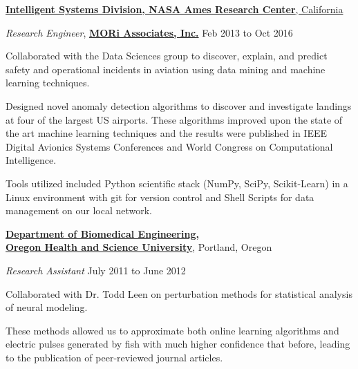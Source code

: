 \documentclass[10pt]{article}
\newenvironment{outerlist}[1][\enskip$\circ$]%
        {\begin{itemize}[#1]}{\end{itemize}%
         \vspace{-.6\baselineskip}}
\newenvironment{innerlist}[1][\enskip$\circ$]%
        {\begin{compactitem}[#1]}{\end{compactitem}}
\begin{document}
\href{http://ti.arc.nasa.gov/}{\textbf{Intelligent Systems Division, NASA Ames Research Center}, California}
\begin{outerlist}
\item[] \textit{Research Engineer}, \href{http://www.moriassociates.com/}{\textbf{MORi Associates, Inc.}} %
\hfill{Feb 2013 to Oct 2016}

  \begin{innerlist}
    \item Collaborated with the Data Sciences group to discover, explain, and predict safety and operational incidents in aviation using data mining and machine learning techniques.
    \item Designed novel anomaly detection algorithms to discover and investigate landings at four of the largest US airports. These algorithms improved upon the state of the art machine learning techniques and the results were published in {\sc IEEE Digital Avionics Systems Conferences} and { World Congress on Computational Intelligence}.
    \item Tools utilized included  {\sc Python} scientific stack ({\sc NumPy, SciPy, Scikit-Learn}) in a  {\sc Linux} environment with {\sc git} for version control and {\sc Shell Scripts} for data management on our local network.

\end{innerlist}
\end{outerlist}
\medbreak
\href{http://www.ogi.edu/bme}{\textbf{Department of Biomedical Engineering, \\Oregon Health and Science University}},
Portland, Oregon
\begin{outerlist}
\item[] \textit{Research Assistant}%
    \hfill {July 2011 to June 2012}
     \begin{innerlist}
     \item Collaborated with Dr. Todd Leen on perturbation methods for statistical analysis of neural modeling.
     \item These methods allowed us to approximate both online learning algorithms and electric pulses generated by fish with much higher confidence that before, leading to the publication of peer-reviewed journal articles.
     \end{innerlist}
   \end{outerlist}
  
\end{document}
